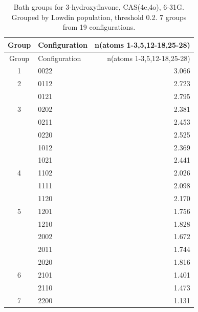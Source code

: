 
\begin{longtable}{c l r}
\caption{Bath groups for 3-hydroxyflavone, CAS(4e,4o), 6-31G. Grouped by Lowdin population, threshold 0.2. 7 groups from 19 configurations.}\\
\hline
Group & Configuration & n(atoms 1-3,5,12-18,25-28) \\
\hline
\endfirsthead
\hline
Group & Configuration & n(atoms 1-3,5,12-18,25-28) \\
\hline
\endhead
1 & 0022 & 3.066 \\
\hline
2 & 0112 & 2.723 \\
 & 0121 & 2.795 \\
\hline
3 & 0202 & 2.381 \\
 & 0211 & 2.453 \\
 & 0220 & 2.525 \\
 & 1012 & 2.369 \\
 & 1021 & 2.441 \\
\hline
4 & 1102 & 2.026 \\
 & 1111 & 2.098 \\
 & 1120 & 2.170 \\
\hline
5 & 1201 & 1.756 \\
 & 1210 & 1.828 \\
 & 2002 & 1.672 \\
 & 2011 & 1.744 \\
 & 2020 & 1.816 \\
\hline
6 & 2101 & 1.401 \\
 & 2110 & 1.473 \\
\hline
7 & 2200 & 1.131 \\
\hline
\end{longtable}
